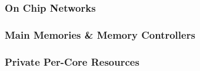 \subsubsection{On Chip Networks}
\subsubsection{Main Memories \& Memory Controllers}
\subsubsection{Private Per-Core Resources}



% 
% 
